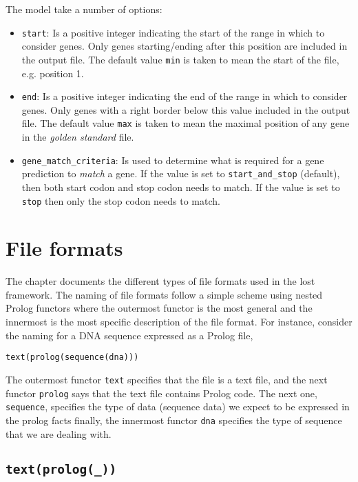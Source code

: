 \documentclass{book}
\begin{document}
\noindent
The model take a number of options: 

\begin{itemize}
\item \texttt{start}: Is a positive integer indicating the start of
  the range in which to consider genes. Only genes starting/ending
  after this position are included in the output file. The default
  value \texttt{min} is taken to mean the start of the file,
  e.g. position 1.
\item \texttt{end}: Is a positive integer indicating the end of the
  range in which to consider genes. Only genes with a right border
  below this value included in the output file. The default value
  \texttt{max} is taken to mean the maximal position of any gene in the
  \emph{golden standard} file.
\item \texttt{gene\_match\_criteria}: Is used to determine what is
  required for a gene prediction to \emph{match} a gene. If the value
  is set to \texttt{start\_and\_stop} (default), then both start codon
  and stop codon needs to match. If the value is set to \texttt{stop}
  then only the stop codon needs to match.
\end{itemize}

\chapter{File formats}

The chapter documents the different types of file formats used in the
lost framework. The naming of file formats follow a simple scheme
using  nested Prolog functors where the outermost functor is the most
general and the innermost is the most specific description of the file
format. For instance, consider the naming for a DNA sequence expressed
as a Prolog file,
\begin{verbatim}
text(prolog(sequence(dna)))
\end{verbatim} 

The outermost functor \texttt{text} specifies that the file is a text
file, and the next functor \texttt{prolog} says that the text file
contains Prolog code. The next one, \texttt{sequence}, specifies the
type of data (sequence data) we expect to be expressed in the prolog
facts finally, the innermost functor \texttt{dna} specifies the type
of sequence that we are dealing with.

\section{\texttt{text(prolog(\_))}}
\end{document}
